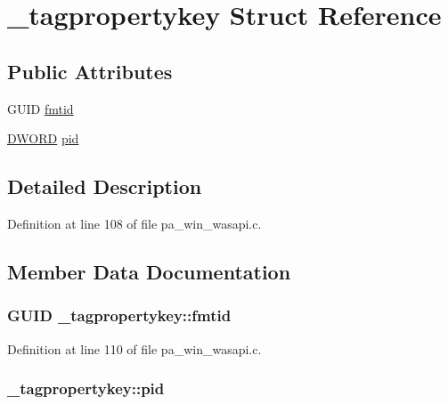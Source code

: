 \hypertarget{struct__tagpropertykey}{}\section{\+\_\+tagpropertykey Struct Reference}
\label{struct__tagpropertykey}
\subsection*{Public Attributes}
\begin{DoxyCompactItemize}
\item 
G\+U\+ID \hyperlink{struct__tagpropertykey_ab8f38fa76c734d53a1345581301e0a2c}{fmtid}
\item 
\hyperlink{mapinls_8h_ad342ac907eb044443153a22f964bf0af}{D\+W\+O\+RD} \hyperlink{struct__tagpropertykey_a447f95b55f362f11e0fad3ede64a4ef0}{pid}
\end{DoxyCompactItemize}


\subsection{Detailed Description}


Definition at line 108 of file pa\+\_\+win\+\_\+wasapi.\+c.



\subsection{Member Data Documentation}
\subsubsection[{\texorpdfstring{fmtid}{fmtid}}]{\setlength{\rightskip}{0pt plus 5cm}G\+U\+ID \+\_\+tagpropertykey\+::fmtid}\hypertarget{struct__tagpropertykey_ab8f38fa76c734d53a1345581301e0a2c}{}\label{struct__tagpropertykey_ab8f38fa76c734d53a1345581301e0a2c}


Definition at line 110 of file pa\+\_\+win\+\_\+wasapi.\+c.

\subsubsection[{\texorpdfstring{pid}{pid}}]{ \+\_\+tagpropertykey\+::pid}\hypertarget{struct__tagpropertykey_a447f95b55f362f11e0fad3ede64a4ef0}{}\label{struct__tagpropertykey_a447f95b55f362f11e0fad3ede64a4ef0}


